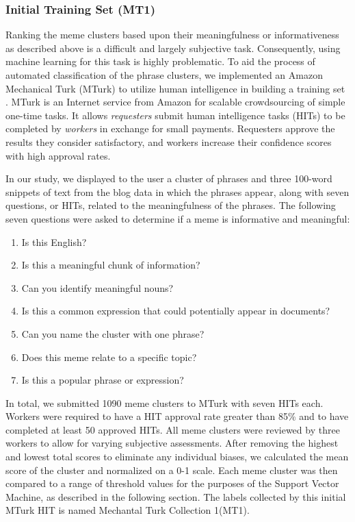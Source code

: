 \documentclass{sig-alternate}
\begin{document}
\subsubsection{Initial Training Set (MT1)}
Ranking the meme clusters based upon their meaningfulness or informativeness as described above is a difficult and largely subjective task. Consequently, using machine learning for this task is highly problematic. To aid the process of automated classification of the phrase clusters, we implemented an Amazon Mechanical Turk (MTurk) to utilize human intelligence in building a training set \cite{Barr2006}. MTurk is an Internet service from Amazon for scalable crowdsourcing of simple one-time tasks. It allows \emph{requesters} submit human intelligence tasks (HITs) to be completed by \emph{workers} in exchange for small payments. Requesters approve the results they consider satisfactory, and workers increase their confidence scores with high approval rates.

In our study, we displayed to the user a cluster of phrases and three 100-word snippets of text from the blog data in which the phrases appear, along with seven questions, or HITs, related to the meaningfulness of the phrases. The following seven questions were asked to determine if a meme is informative and meaningful: 

\begin{enumerate}

\item Is this English?
\item Is this a meaningful chunk of information?
\item Can you identify meaningful nouns?
\item Is this a common expression that could potentially appear in documents?
\item Can you name the cluster with one phrase?
\item Does this meme relate to a specific topic?
\item Is this a popular phrase or expression? 
\end{enumerate}

In total, we submitted 1090 meme clusters to MTurk with seven HITs each. Workers were required to have a HIT approval rate greater than 85\% and to have completed at least 50 approved HITs.
  All meme clusters were reviewed by three workers to allow for varying subjective assessments.  After removing the highest and lowest total scores to eliminate any individual biases, we calculated the mean score of the cluster and normalized on a 0-1 scale. Each meme cluster was then compared to a range of threshold values for the purposes of the Support Vector Machine, as described in the following section. The labels collected by this initial MTurk HIT is named Mechantal Turk Collection 1(MT1).
\end{document}
